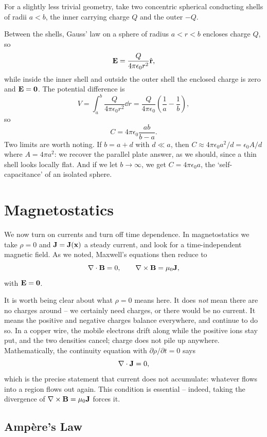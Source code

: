 \documentclass[a4paper]{scrartcl}
\newcommand{\hh}[1]{\hat{\vv{#1}}}
\begin{document}
\begin{example}
	For a slightly less trivial geometry, take two concentric spherical conducting shells of radii $a < b$, the inner carrying charge $Q$ and the outer $-Q$.

	Between the shells, Gauss' law on a sphere of radius $a < r < b$ encloses charge $Q$, so
	$$
	\vv{E} = \frac{Q}{4\pi\epsilon_0 r^2}\hh{r},
	$$
	while inside the inner shell and outside the outer shell the enclosed charge is zero and $\mathbf{E} = \mathbf{0}$. The potential difference is
	$$
	V = \int_a^b \frac{Q}{4\pi \epsilon_0 r^2}\dd r = \frac{Q}{4\pi\epsilon_0}\left(\frac{1}{a}-\frac{1}{b}\right),
	$$
	so
	$$
	C = 4\pi \epsilon_0 \frac{ab}{b-a}.
	$$
	Two limits are worth noting. If $b = a + d$ with $d \ll a$, then $C \approx 4\pi\epsilon_0 a^2/d = \epsilon_0 A/d$ where $A = 4\pi a^2$: we recover the parallel plate answer, as we should, since a thin shell looks locally flat. And if we let $b\to\infty$, we get $C = 4\pi\epsilon_0 a$, the `self-capacitance' of an isolated sphere.
\end{example}

\section{Magnetostatics}

We now turn on currents and turn off time dependence. In magnetostatics we take $\rho = 0$ and $\mathbf{J} = \mathbf{J}(\mathbf{x})$ a steady current, and look for a time-independent magnetic field. As we noted, Maxwell's equations then reduce to
$$
\nabla \cdot \mathbf{B} = 0, \qquad \nabla \times \mathbf{B} = \mu_0 \mathbf{J},
$$
with $\mathbf{E} = \mathbf{0}$.

It is worth being clear about what $\rho = 0$ means here. It does \emph{not} mean there are no charges around -- we certainly need charges, or there would be no current. It means the positive and negative charges balance everywhere, and continue to do so. In a copper wire, the mobile electrons drift along while the positive ions stay put, and the two densities cancel; charge does not pile up anywhere. Mathematically, the continuity equation with $\partial \rho/\partial t = 0$ says
$$
\nabla \cdot \mathbf{J} = 0,
$$
which is the precise statement that current does not accumulate: whatever flows into a region flows out again. This condition is essential -- indeed, taking the divergence of $\nabla\times \mathbf{B} = \mu_0 \mathbf{J}$ forces it.

\subsection{Amp\`ere's Law}
\end{document}
